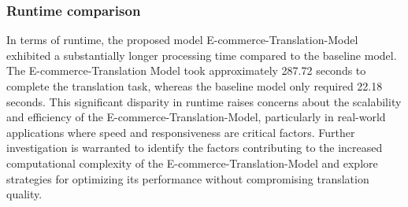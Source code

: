 \documentclass[sigconf]{acmart}
\begin{document}
\subsubsection{Runtime comparison}
In terms of runtime, the proposed model E-commerce-Translation-Model exhibited a substantially longer processing time compared to the baseline model. The E-commerce-Translation Model took approximately 287.72 seconds to complete the translation task, whereas the baseline model only required 22.18 seconds. This significant disparity in runtime raises concerns about the scalability and efficiency of the E-commerce-Translation-Model, particularly in real-world applications where speed and responsiveness are critical factors. Further investigation is warranted to identify the factors contributing to the increased computational complexity\cite{goldreich_2008} of the E-commerce-Translation-Model and explore strategies for optimizing its performance without compromising translation quality.






 
\end{document}
